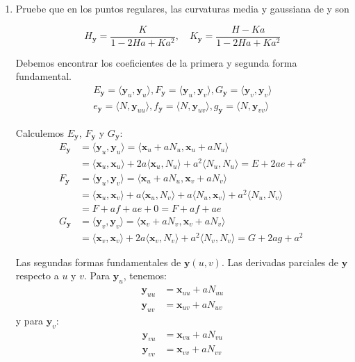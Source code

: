 \begin{problema}
\begin{enumerate}
\begin{sol}
           
        \end{sol}
        \item Pruebe que en los puntos regulares, las curvaturas media y gaussiana de y son
        
        $$
        H_{\mathbf{y}}=\frac{K}{1-2 H a+K a^{2}}, \quad K_{\mathbf{y}}=\frac{H-K a}{1-2 H a+K a^{2}}
        $$
        \begin{sol}
            Debemos encontrar los coeficientes de la primera y segunda forma fundamental. 
            \begin{align*}
                E_{\mathbf{y}} = \langle\mathbf{y}_u, \mathbf{y}_u\rangle, F_{\mathbf{y}} = \langle\mathbf{y}_u, \mathbf{y}_v\rangle, G_{\mathbf{y}} = \langle\mathbf{y}_v, \mathbf{y}_v\rangle\\
                e_{\mathbf{y}} = \langle N, \mathbf{y}_{uu} \rangle , f_{\mathbf{y}} = \langle N, \mathbf{y}_{uv} \rangle, g_{\mathbf{y}} = \langle N, \mathbf{y}_{vv} \rangle 
            \end{align*}
            
            Calculemos $E_{\mathbf{y}}$, $F_{\mathbf{y}}$ y $G_{\mathbf{y}}$:
            \begin{align*}
                E_{\mathbf{y}} &= \langle\mathbf{y}_u, \mathbf{y}_u\rangle = \langle\mathbf{x}_u + a N_u, \mathbf{x}_u + a N_u\rangle\\
                & = \langle\mathbf{x}_u, \mathbf{x}_u\rangle + 2a\langle\mathbf{x}_u, N_u\rangle + a^2\langle N_u, N_u\rangle = E + 2ae + a^2\\
                F_{\mathbf{y}} &= \langle\mathbf{y}_u, \mathbf{y}_v\rangle = \langle\mathbf{x}_u + a N_u, \mathbf{x}_v + a N_v\rangle\\
                & = \langle\mathbf{x}_u, \mathbf{x}_v\rangle + a\langle\mathbf{x}_u, N_v\rangle + a\langle N_u, \mathbf{x}_v\rangle + a^2\langle N_u, N_v\rangle\\
                & = F + af + ae + 0 = F + af + ae\\
                G_{\mathbf{y}} &= \langle\mathbf{y}_v, \mathbf{y}_v\rangle = \langle\mathbf{x}_v + a N_v, \mathbf{x}_v + a N_v\rangle\\
                & = \langle\mathbf{x}_v, \mathbf{x}_v\rangle + 2a\langle\mathbf{x}_v, N_v\rangle + a^2\langle N_v, N_v\rangle = G + 2ag + a^2
            \end{align*}
            

Las segundas formas fundamentales de $\mathbf{y}(u, v)$. Las derivadas parciales de $\mathbf{y}$ respecto a $u$ y $v$. Para $\mathbf{y}_u$, tenemos:
\begin{align*}
    \mathbf{y}_{uu} &= \mathbf{x}_{uu} + a N_{uu}\\
    \mathbf{y}_{uv} &= \mathbf{x}_{uv} + a N_{uv}
\end{align*}
y para $\mathbf{y}_v$:
\begin{align*}
    \mathbf{y}_{vu} &= \mathbf{x}_{vu} + a N_{vu}\\
    \mathbf{y}_{vv} &= \mathbf{x}_{vv} + a N_{vv}
\end{align*}


\end{sol}
\end{enumerate}
\end{problema}
